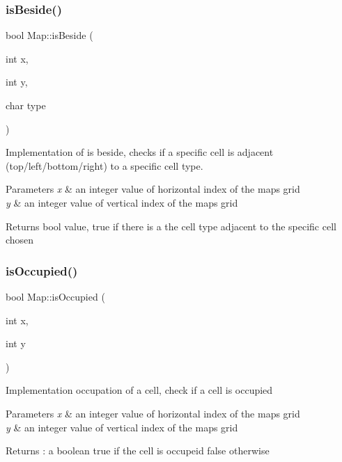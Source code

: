\subsubsection{\texorpdfstring{is\+Beside()}{isBeside()}}
{\footnotesize\ttfamily bool Map\+::is\+Beside (\begin{DoxyParamCaption}\item[{int}]{x,  }\item[{int}]{y,  }\item[{char}]{type }\end{DoxyParamCaption})}

Implementation of is beside, checks if a specific cell is adjacent (top/left/bottom/right) to a specific cell type. 
\begin{DoxyParams}{Parameters}
{\em x} & an integer value of horizontal index of the map\textquotesingle{}s grid \\
\hline
{\em y} & an integer value of vertical index of the map\textquotesingle{}s grid \\
\hline
\end{DoxyParams}
\begin{DoxyReturn}{Returns}
bool value, true if there is a the cell type adjacent to the specific cell chosen 
\end{DoxyReturn}
\hypertarget{classMap_a79e5ced99d160ca9b680661169f16d84}{}\label{classMap_a79e5ced99d160ca9b680661169f16d84} 
\subsubsection{\texorpdfstring{is\+Occupied()}{isOccupied()}}
{\footnotesize\ttfamily bool Map\+::is\+Occupied (\begin{DoxyParamCaption}\item[{int}]{x,  }\item[{int}]{y }\end{DoxyParamCaption})}

Implementation occupation of a cell, check if a cell is occupied 
\begin{DoxyParams}{Parameters}
{\em x} & an integer value of horizontal index of the map\textquotesingle{}s grid \\
\hline
{\em y} & an integer value of vertical index of the map\textquotesingle{}s grid \\
\hline
\end{DoxyParams}
\begin{DoxyReturn}{Returns}
\+: a boolean true if the cell is occupeid false otherwise 
\end{DoxyReturn}
\hypertarget{classMap_a91d9e239a9871b99a5d6d2d5d46b0504}{}\label{classMap_a91d9e239a9871b99a5d6d2d5d46b0504} 
